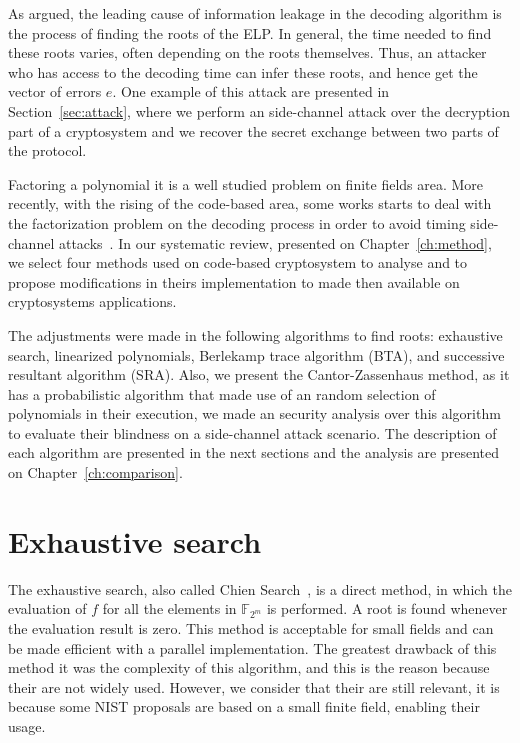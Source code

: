 As argued, the leading cause of information leakage in the decoding algorithm is the process of finding the roots of the ELP. In general, the time needed to find these roots varies, often depending on the roots themselves. Thus, an attacker who has access to the decoding time can infer these roots, and hence get the vector of errors $e$. One example of this attack are presented in Section~\ref{sec:attack}, where we perform an side-channel attack over the decryption part of a cryptosystem and we recover the secret exchange between two parts of the protocol.

Factoring a polynomial it is a well studied problem on finite fields area. More recently, with the rising of the code-based area, some works starts to deal with the factorization problem on the decoding process in order to avoid timing side-channel attacks~\cite{shoufan2009timing, bucerzan2017improved}. In our systematic review, presented on Chapter~\ref{ch:method}, we select four methods used on code-based cryptosystem to analyse and to propose modifications in theirs implementation to made then available on cryptosystems applications.

The adjustments were made in the following algorithms to find roots: exhaustive search, linearized polynomials, Berlekamp trace algorithm (BTA), and successive resultant algorithm (SRA). Also, we present the Cantor-Zassenhaus method, as it has a probabilistic algorithm that made use of an random selection of polynomials in their execution, we made an security analysis over this algorithm to evaluate their blindness on a side-channel attack scenario. The description of each algorithm are presented in the next sections and the analysis are presented on Chapter~\ref{ch:comparison}.

\section{Exhaustive search}
The exhaustive search, also called Chien Search~\cite{chien1964cyclic}, is a direct method, in which the evaluation of $f$ for all the elements in $\mathbb{F}_{2^m}$ is performed. A root is found whenever the evaluation result is zero. This method is acceptable for small fields and can be made efficient with a parallel implementation. The greatest drawback of this method it was the complexity of this algorithm, and this is the reason because their are not widely used. However, we consider that their are still relevant, it is because some NIST proposals are based on a small finite field, enabling their usage. 

